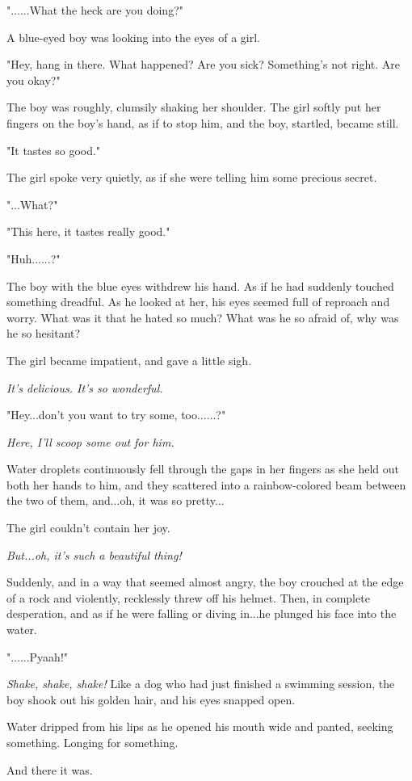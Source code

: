 \documentclass[
]{article}
\begin{document}
"......What the heck are you doing?"

A blue-eyed boy was looking into the eyes of a girl.

"Hey, hang in there. What happened? Are you sick? Something's not right.
Are you okay?"

The boy was roughly, clumsily shaking her shoulder. The girl softly put
her fingers on the boy's hand, as if to stop him, and the boy, startled,
became still.

"It tastes so good."

The girl spoke very quietly, as if she were telling him some precious
secret.

"...What?"

"This here, it tastes really good."

"Huh......?"

The boy with the blue eyes withdrew his hand. As if he had suddenly
touched something dreadful. As he looked at her, his eyes seemed full of
reproach and worry. What was it that he hated so much? What was he so
afraid of, why was he so hesitant?

The girl became impatient, and gave a little sigh.

\emph{It's delicious. It's so wonderful.}

"Hey...don't you want to try some, too......?"

\emph{Here, I'll scoop some out for him.}

Water droplets continuously fell through the gaps in her fingers as she
held out both her hands to him, and they scattered into a
rainbow-colored beam between the two of them, and...oh, it was so
pretty...

The girl couldn't contain her joy.

\emph{But...oh, it's such a beautiful thing!}

Suddenly, and in a way that seemed almost angry, the boy crouched at the
edge of a rock and violently, recklessly threw off his helmet. Then, in
complete desperation, and as if he were falling or diving in...he
plunged his face into the water.

"......Pyaah!"

\emph{Shake, shake, shake!} Like a dog who had just finished a swimming
session, the boy shook out his golden hair, and his eyes snapped open.

Water dripped from his lips as he opened his mouth wide and panted,
seeking something. Longing for something.

And there it was.
\end{document}
